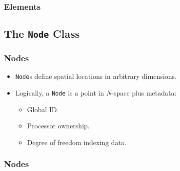 \begin{frame}[shrink]
  \frametitle{Elements}
  
\end{frame}

 

\subsection{The \texttt{Node} Class}
\begin{frame}
  \frametitle{Nodes}
  \begin{block}{}
    \begin{itemize}
      \item \texttt{Node}s define spatial locations in arbitrary dimensions.
      \item Logically, a \texttt{Node} is a point in \emph{N}-space plus metadata:
        \begin{itemize}
          \item Global ID.
          \item Processor ownership.
          \item Degree of freedom indexing data.
        \end{itemize}
    \end{itemize}
  \end{block}
\end{frame}

\begin{frame}
  \frametitle{Nodes}
  
\end{frame}

